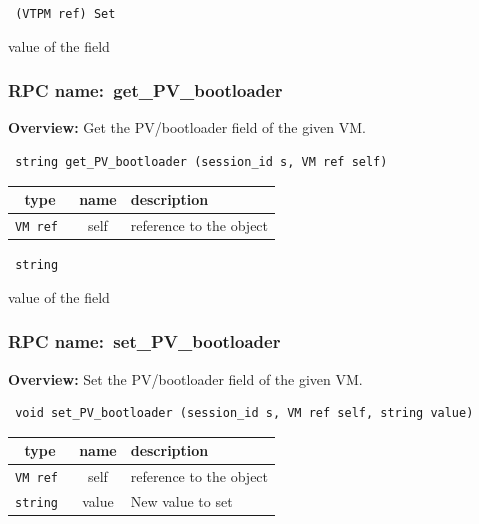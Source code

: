 \vspace{0.3cm}

{\tt 
(VTPM ref) Set
}


value of the field
\vspace{0.3cm}
\vspace{0.3cm}
\vspace{0.3cm}
\subsubsection{RPC name:~get\_PV\_bootloader}

{\bf Overview:} 
Get the PV/bootloader field of the given VM.

\begin{verbatim} string get_PV_bootloader (session_id s, VM ref self)\end{verbatim}



 
\vspace{0.3cm}
\begin{tabular}{|c|c|p{7cm}|}
 \hline
{\bf type} & {\bf name} & {\bf description} \\ \hline
{\tt VM ref } & self & reference to the object \\ \hline 

\end{tabular}

\vspace{0.3cm}

{\tt 
string
}


value of the field
\vspace{0.3cm}
\vspace{0.3cm}
\vspace{0.3cm}
\subsubsection{RPC name:~set\_PV\_bootloader}

{\bf Overview:} 
Set the PV/bootloader field of the given VM.

\begin{verbatim} void set_PV_bootloader (session_id s, VM ref self, string value)\end{verbatim}



 
\vspace{0.3cm}
\begin{tabular}{|c|c|p{7cm}|}
 \hline
{\bf type} & {\bf name} & {\bf description} \\ \hline
{\tt VM ref } & self & reference to the object \\ \hline 

{\tt string } & value & New value to set \\ \hline 

\end{tabular}

